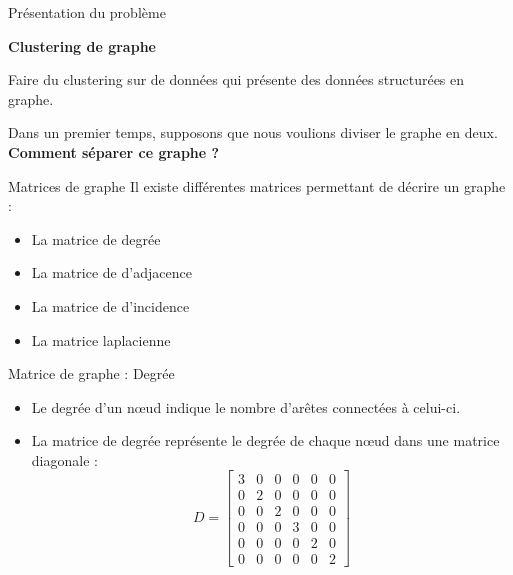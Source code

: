 \begin{frame}{Présentation du problème}
    \begin{minipage}{0.49\linewidth}
        \textbf{Clustering de graphe}

        Faire du clustering sur de données qui présente des données structurées en graphe.

        Dans un premier temps, supposons que nous voulions diviser le graphe en deux.
        \\

        \alert{\textbf{Comment séparer ce graphe ?}}
    \end{minipage}
    \begin{minipage}{0.49\linewidth}
    \end{minipage}
\end{frame}

\begin{frame}{Matrices de graphe}
    Il existe différentes matrices permettant de décrire un graphe :
    \begin{itemize}
        \item La matrice de degrée
        \item La matrice de d'adjacence
        \item La matrice de d'incidence
        \item La matrice laplacienne
    \end{itemize}
\end{frame}

\begin{frame}{Matrice de graphe : Degrée}
    \begin{minipage}{0.49\linewidth}
        \begin{itemize}
            \item Le \alert{degrée d'un nœud} indique le nombre d'arêtes connectées à celui-ci.
            \item La \alert{matrice de degrée} représente le degrée de chaque nœud dans une matrice diagonale :
            $$
            D = \left[\begin{array}{cccccc}
                3 & 0 & 0 & 0 & 0 & 0\\
                0 & 2 & 0 & 0 & 0 & 0\\
                0 & 0 & 2 & 0 & 0 & 0\\
                0 & 0 & 0 & 3 & 0 & 0\\
                0 & 0 & 0 & 0 & 2 & 0\\
                0 & 0 & 0 & 0 & 0 & 2
            \end{array}\right]
            $$
        \end{itemize}
    \end{minipage}
    \begin{minipage}{0.49\linewidth}
    \end{minipage}
\end{frame}

